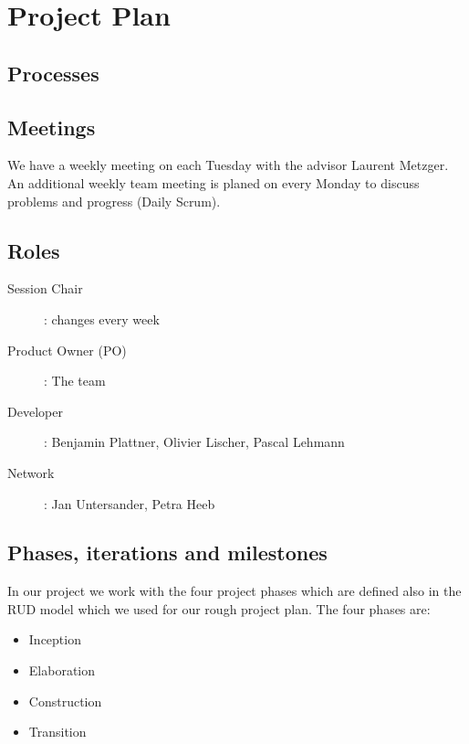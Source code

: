 \chapter{Project Plan}


\section{Processes}

\section{Meetings}
We have a weekly meeting on each Tuesday with the advisor Laurent Metzger.
An additional weekly team meeting is planed on every Monday to discuss problems and progress (Daily Scrum).

\section{Roles}
\begin{description}
  \item[Session Chair]: changes every week
  \item[Product Owner (PO)]: The team
  \item[Developer]: Benjamin Plattner, Olivier Lischer, Pascal Lehmann
  \item[Network]: Jan Untersander, Petra Heeb
\end{description}

\section{Phases, iterations and milestones}
In our project we work with the four project phases which are defined also in the RUD model which we used for our rough project plan. The four phases are:
\begin{itemize}
    \item Inception
    \item Elaboration
    \item Construction
    \item Transition
\end{itemize}

